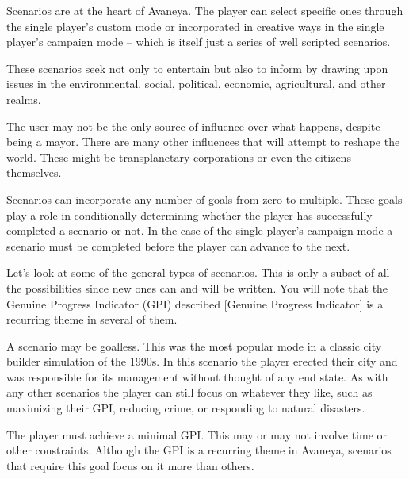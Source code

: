 

Scenarios are at the heart of Avaneya. The player can select specific ones through the single player's custom mode or incorporated in creative ways in the single player's campaign mode -- which is itself just a series of well scripted scenarios.

These scenarios seek not only to entertain but also to inform by drawing upon issues in the environmental, social, political, economic, agricultural, and other realms.

The user may not be the only source of influence over what happens, despite being a mayor. There are many other influences that will attempt to reshape the world. These might be transplanetary corporations or even the citizens themselves.

Scenarios can incorporate any number of goals from zero to multiple. These goals play a role in conditionally determining whether the player has successfully completed a scenario or not. In the case of the single player's campaign mode a scenario must be completed before the player can advance to the next.

Let's look at some of the general types of scenarios. This is only a subset of all the possibilities since new ones can and will be written. You will note that the Genuine Progress Indicator (GPI) described [Genuine Progress Indicator] is a recurring theme in several of them.


A scenario may be goalless. This was the most popular mode in a classic city builder simulation of the 1990s. In this scenario the player erected their city and was responsible for its management without thought of any end state. As with any other scenarios the player can still focus on whatever they like, such as maximizing their GPI, reducing crime, or responding to natural disasters.


The player must achieve a minimal GPI. This may or may not involve time or other constraints. Although the GPI is a recurring theme in Avaneya, scenarios that require this goal focus on it more than others.



